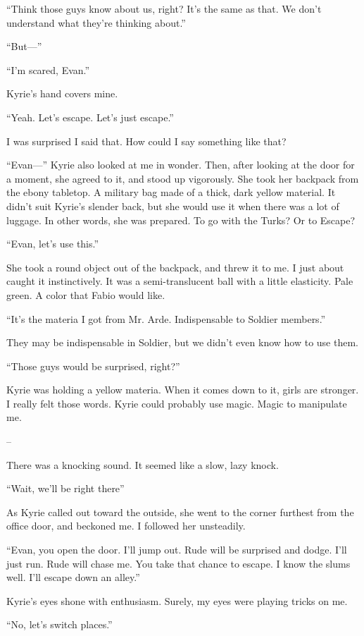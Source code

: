 \documentclass[oneside]{book}
\begin{document}
“Think those guys know about us, right? It’s the same as that. We don’t understand what they’re thinking about.”

“But—”

“I’m scared, Evan.”

Kyrie’s hand covers mine.

“Yeah. Let’s escape. Let’s just escape.”

I was surprised I said that. How could I say something like that?

“Evan—” Kyrie also looked at me in wonder. Then, after looking at the door for a moment, she agreed to it, and stood up vigorously. She took her backpack from the ebony tabletop. A military bag made of a thick, dark yellow material. It didn’t suit Kyrie’s slender back, but she would use it when there was a lot of luggage. In other words, she was prepared. To go with the Turks? Or to Escape?

“Evan, let’s use this.”

She took a round object out of the backpack, and threw it to me. I just about caught it instinctively. It was a semi-translucent ball with a little elasticity. Pale green. A color that Fabio would like.

“It’s the materia I got from Mr. Arde. Indispensable to Soldier members.”

They may be indispensable in Soldier, but we didn’t even know how to use them.

“Those guys would be surprised, right?”

Kyrie was holding a yellow materia. When it comes down to it, girls are stronger. I really felt those words. Kyrie could probably use magic. Magic to manipulate me.

–

There was a knocking sound. It seemed like a slow, lazy knock.

“Wait, we’ll be right there”

As Kyrie called out toward the outside, she went to the corner furthest from the office door, and beckoned me. I followed her unsteadily.

“Evan, you open the door. I’ll jump out. Rude will be surprised and dodge. I’ll just run. Rude will chase me. You take that chance to escape. I know the slums well. I’ll escape down an alley.”

Kyrie’s eyes shone with enthusiasm. Surely, my eyes were playing tricks on me.

“No, let’s switch places.”
\end{document}
